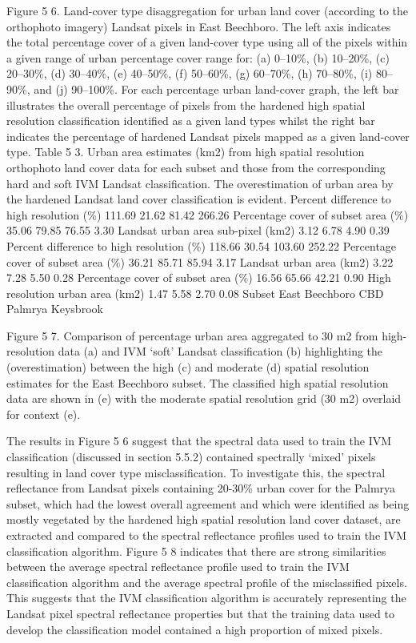 \documentclass[]{book}
\begin{document}
Figure 5 6. Land-cover type disaggregation for urban land cover
(according to the orthophoto imagery) Landsat pixels in East Beechboro.
The left axis indicates the total percentage cover of a given land-cover
type using all of the pixels within a given range of urban percentage
cover range for: (a) 0--10\%, (b) 10--20\%, (c) 20--30\%, (d) 30--40\%,
(e) 40--50\%, (f) 50--60\%, (g) 60--70\%, (h) 70--80\%, (i) 80--90\%,
and (j) 90--100\%. For each percentage urban land-cover graph, the left
bar illustrates the overall percentage of pixels from the hardened high
spatial resolution classification identified as a given land types
whilst the right bar indicates the percentage of hardened Landsat pixels
mapped as a given land-cover type. Table 5 3. Urban area estimates (km2)
from high spatial resolution orthophoto land cover data for each subset
and those from the corresponding hard and soft IVM Landsat
classification. The overestimation of urban area by the hardened Landsat
land cover classification is evident. Percent difference to high
resolution (\%) 111.69 21.62 81.42 266.26 Percentage cover of subset
area (\%) 35.06 79.85 76.55 3.30 Landsat urban area sub-pixel (km2) 3.12
6.78 4.90 0.39 Percent difference to high resolution (\%) 118.66 30.54
103.60 252.22 Percentage cover of subset area (\%) 36.21 85.71 85.94
3.17 Landsat urban area (km2) 3.22 7.28 5.50 0.28 Percentage cover of
subset area (\%) 16.56 65.66 42.21 0.90 High resolution urban area (km2)
1.47 5.58 2.70 0.08 Subset East Beechboro CBD Palmrya Keysbrook

Figure 5 7. Comparison of percentage urban area aggregated to 30 m2 from
high-resolution data (a) and IVM `soft' Landsat classification (b)
highlighting the (overestimation) between the high (c) and moderate (d)
spatial resolution estimates for the East Beechboro subset. The
classified high spatial resolution data are shown in (e) with the
moderate spatial resolution grid (30 m2) overlaid for context (e).

The results in Figure 5 6 suggest that the spectral data used to train
the IVM classification (discussed in section 5.5.2) contained spectrally
`mixed' pixels resulting in land cover type misclassification. To
investigate this, the spectral reflectance from Landsat pixels
containing 20-30\% urban cover for the Palmrya subset, which had the
lowest overall agreement and which were identified as being mostly
vegetated by the hardened high spatial resolution land cover dataset,
are extracted and compared to the spectral reflectance profiles used to
train the IVM classification algorithm. Figure 5 8 indicates that there
are strong similarities between the average spectral reflectance profile
used to train the IVM classification algorithm and the average spectral
profile of the misclassified pixels. This suggests that the IVM
classification algorithm is accurately representing the Landsat pixel
spectral reflectance properties but that the training data used to
develop the classification model contained a high proportion of mixed
pixels.
\end{document}
